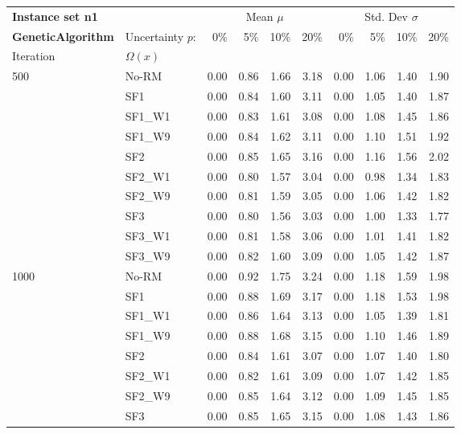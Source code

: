 \newpage

{\fontsize{10}{11} \selectfont
\begin{longtable}{ll|rrrr|rrrr}
\toprule
\textbf{Instance set n1}                 & {} & \multicolumn{4}{c|}{Mean $\mu$} & \multicolumn{4}{c}{Std. Dev $\sigma$} \\
\textbf{GeneticAlgorithm}                 & Uncertainty $p$: & 0\% & 5\% & 10\% & 20\% & 0\% & 5\% & 10\% & 20\% \\
Iteration & $\Omega(x)$ &      &      &      &      &      &      &      &      \\
\midrule
500  & No-RM & 0.00 & 0.86 & 1.66 & 3.18 & 0.00 & 1.06 & 1.40 & 1.90 \\
     & SF1 & 0.00 & 0.84 & 1.60 & 3.11 & 0.00 & 1.05 & 1.40 & 1.87 \\
     & SF1\_W1 & 0.00 & 0.83 & 1.61 & 3.08 & 0.00 & 1.08 & 1.45 & 1.86 \\
     & SF1\_W9 & 0.00 & 0.84 & 1.62 & 3.11 & 0.00 & 1.10 & 1.51 & 1.92 \\
     & SF2 & 0.00 & 0.85 & 1.65 & 3.16 & 0.00 & 1.16 & 1.56 & 2.02 \\
     & SF2\_W1 & 0.00 & 0.80 & 1.57 & 3.04 & 0.00 & 0.98 & 1.34 & 1.83 \\
     & SF2\_W9 & 0.00 & 0.81 & 1.59 & 3.05 & 0.00 & 1.06 & 1.42 & 1.82 \\
     & SF3 & 0.00 & 0.80 & 1.56 & 3.03 & 0.00 & 1.00 & 1.33 & 1.77 \\
     & SF3\_W1 & 0.00 & 0.81 & 1.58 & 3.06 & 0.00 & 1.01 & 1.41 & 1.82 \\
     & SF3\_W9 & 0.00 & 0.82 & 1.60 & 3.09 & 0.00 & 1.05 & 1.42 & 1.87 \\ \hline
1000 & No-RM & 0.00 & 0.92 & 1.75 & 3.24 & 0.00 & 1.18 & 1.59 & 1.98 \\
     & SF1 & 0.00 & 0.88 & 1.69 & 3.17 & 0.00 & 1.18 & 1.53 & 1.98 \\
     & SF1\_W1 & 0.00 & 0.86 & 1.64 & 3.13 & 0.00 & 1.05 & 1.39 & 1.81 \\
     & SF1\_W9 & 0.00 & 0.88 & 1.68 & 3.15 & 0.00 & 1.10 & 1.46 & 1.89 \\
     & SF2 & 0.00 & 0.84 & 1.61 & 3.07 & 0.00 & 1.07 & 1.40 & 1.80 \\
     & SF2\_W1 & 0.00 & 0.82 & 1.61 & 3.09 & 0.00 & 1.07 & 1.42 & 1.85 \\
     & SF2\_W9 & 0.00 & 0.85 & 1.64 & 3.12 & 0.00 & 1.09 & 1.45 & 1.85 \\
     & SF3 & 0.00 & 0.85 & 1.65 & 3.15 & 0.00 & 1.08 & 1.43 & 1.86 \\

\end{longtable}}
